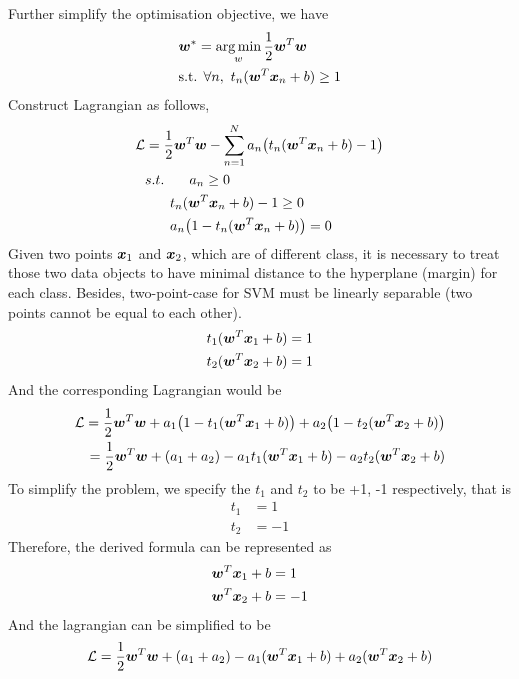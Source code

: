\documentclass[11pt,a4paper]{article}
\newcommand{\htab}{\hspace*{0.63cm}}
\DeclareMathOperator*{\argmin}{arg\,min}
\begin{document}
\htab Further simplify the optimisation objective, we have
\begin{align}
    &\ws = \argmin_{w} \frac{1}{2} \wt\w \\
    &\text{s.t. $\forall n,\ \tmargin \geq 1$} \nonumber
    \end{align}
\htab Construct Lagrangian as follows,
\begin{align}
    \lagg &= \frac{1}{2} \wt \w - \sumn a_{n} \big(  t_{n} (\wt \xn + b)  - 1\big)  \label{4:generalLag} \\
          & s.t.\htab  a_{n} \geq 0 \nonumber \\
          & \htab  t_{n} (\wt \xn + b) - 1 \geq 0 \\
          & \htab a_{n} \big( 1 - t_{n} (\wt \xn + b) \big) = 0 \nonumber
    \end{align}
\htab Given two points $\boldsymbol{x}_{1}$ and $\boldsymbol{x}_{2}$, which are of different class, it is necessary to
treat those two data objects to have minimal distance to the hyperplane (margin) for each class.
Besides, two-point-case for SVM must be linearly separable (two points cannot be equal to each other).
\begin{align}
    t_{1} (\boldsymbol{w}^{T} \boldsymbol{x}_{1} + b ) = 1 \\
    t_{2} (\boldsymbol{w}^{T} \boldsymbol{x}_{2} + b ) = 1 
    \end{align}
\htab And the corresponding Lagrangian would be 
\begin{align}
    \mathcal{L}
    =\frac{1}{2} \boldsymbol{w}^{T} \boldsymbol{w} + a_{1} \big( 1 - t_{1} (\boldsymbol{w}^{T} \boldsymbol{x}_{1} + b) \big) + a_{2} \big( 1 - t_{2} (\boldsymbol{w}^{T}\boldsymbol{x}_{2} + b)\big) \\
    =\frac{1}{2} \boldsymbol{w}^{T} \boldsymbol{w} + ( a_{1} + a_{2} ) - a_{1}t_{1} (\boldsymbol{w}^{T}\boldsymbol{x}_{1} + b) - a_{2}t_{2} (\boldsymbol{w}^{T}\boldsymbol{x}_{2} + b) 
    \end{align}
\htab To simplify the problem, we specify the $t_{1}$ and $t_{2}$ to be +1, -1 respectively, that is
\begin{align}
    t_{1} &= 1 \\
    t_{2} &= -1
    \end{align}
\htab Therefore, the derived formula can be represented as 
\begin{align}
    \boldsymbol{w}^{T} \boldsymbol{x}_{1} + b &= 1  \label{3:x1}\\
    \boldsymbol{w}^{T} \boldsymbol{x}_{2} + b &= -1  \label{3:x2}
    \end{align}
\htab And the lagrangian can be simplified to be 
\begin{align} \label{3:2plag}
    \mathcal{L} =  \frac{1}{2} \boldsymbol{w}^{T} \boldsymbol{w} + ( a_{1} + a_{2} ) - a_{1} (\boldsymbol{w}^{T}\boldsymbol{x}_{1} + b) + a_{2}(\boldsymbol{w}^{T}\boldsymbol{x}_{2} + b)
    \end{align}
\end{document}
